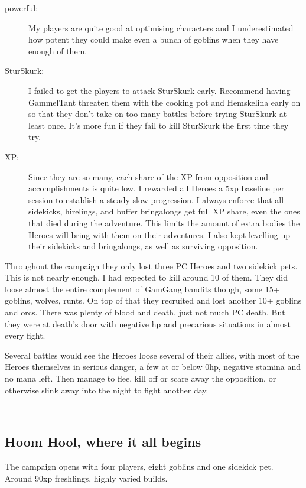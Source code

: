 \begin{description}
    \item[powerful:] My players are quite good at optimising characters and I underestimated how potent they could make even a bunch of goblins when they have enough of them.

    \item[SturSkurk:] I failed to get the players to attack SturSkurk early. Recommend having GammelTant threaten them with the cooking pot and Hemskelina early on so that they don't take on too many battles before trying SturSkurk at least once. It's more fun if they fail to kill SturSkurk the first time they try.
    
    \item[XP:] Since they are so many, each share of the XP from opposition and accomplishments is quite low. I rewarded all Heroes a 5xp baseline per session to establish a steady slow progression. I always enforce that all sidekicks, hirelings, and buffer bringalongs get full XP share, even the ones that died during the adventure. This limits the amount of extra bodies the Heroes will bring with them on their adventures. I also kept levelling up their sidekicks and bringalongs, as well as surviving opposition.

\end{description}

\noindent Throughout the campaign they only lost three PC Heroes and two sidekick pets. This is not nearly enough. I had expected to kill around 10 of them. They did loose almost the entire complement of GamGang bandits though, some 15+ goblins, wolves, runts. On top of that they recruited and lost another 10+ goblins and orcs. There was plenty of blood and death, just not much PC death. But they were at death's door with negative hp and precarious situations in almost every fight.

Several battles would see the Heroes loose several of their allies, with most of the Heroes themselves in serious danger, a few at or below 0hp, negative stamina and no mana left. Then manage to flee, kill off or scare away the opposition, or otherwise slink away into the night to fight another day.

\


\subsection*{Hoom Hool, where it all begins}                            %

The campaign opens with four players, eight goblins and one sidekick pet. Around 90xp freshlings, highly varied builds. 

